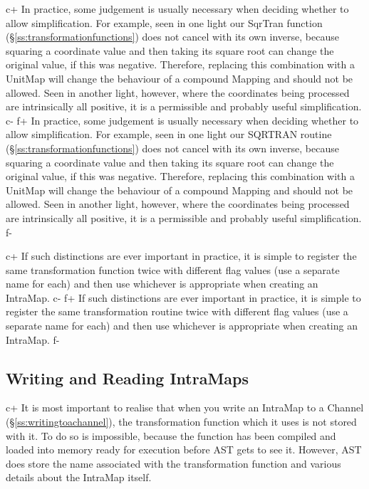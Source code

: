 \documentclass[twoside,11pt]{article}
\newcommand{\secref}[1]{\S\ref{#1}}
\newcommand{\secref}[1]{\ref{#1}}
\begin{document}
c+
In practice, some judgement is usually necessary when deciding whether
to allow simplification. For example, seen in one light our SqrTran
function (\secref{ss:transformationfunctions}) does not cancel with
its own inverse, because squaring a coordinate value and then taking
its square root can change the original value, if this was
negative. Therefore, replacing this combination with a UnitMap will
change the behaviour of a compound Mapping and should not be
allowed. Seen in another light, however, where the coordinates being
processed are intrinsically all positive, it is a permissible and
probably useful simplification.
c-
f+
In practice, some judgement is usually necessary when deciding whether
to allow simplification. For example, seen in one light our SQRTRAN
routine (\secref{ss:transformationfunctions}) does not cancel with its
own inverse, because squaring a coordinate value and then taking its
square root can change the original value, if this was
negative. Therefore, replacing this combination with a UnitMap will
change the behaviour of a compound Mapping and should not be
allowed. Seen in another light, however, where the coordinates being
processed are intrinsically all positive, it is a permissible and
probably useful simplification.
f-

c+
If such distinctions are ever important in practice, it is simple to
register the same transformation function twice with different flag
values (use a separate name for each) and then use whichever is
appropriate when creating an IntraMap.
c-
f+
If such distinctions are ever important in practice, it is simple to
register the same transformation routine twice with different flag
values (use a separate name for each) and then use whichever is
appropriate when creating an IntraMap.
f-

\subsection{\label{ss:readingandwritingintramaps}Writing and Reading IntraMaps}

c+
It is most important to realise that when you write an IntraMap to a
Channel (\secref{ss:writingtoachannel}), the transformation function
which it uses is not stored with it. To do so is impossible, because
the function has been compiled and loaded into memory ready for
execution before AST gets to see it. However, AST does store the name
associated with the transformation function and various details about
the IntraMap itself.
\end{document}
